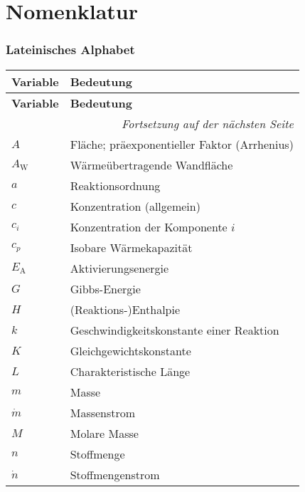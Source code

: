 \chapter*{Nomenklatur}

\setlength{\LTleft}{0pt}
\setlength{\LTright}{0pt}

\subsection*{Lateinisches Alphabet}
\begin{small}
\begin{flushleft}
\begin{longtable}{@{}ll@{}}
\toprule
\textbf{Variable} & \textbf{Bedeutung} \\
\midrule
\endfirsthead
\toprule
\textbf{Variable} & \textbf{Bedeutung} \\
\midrule
\endhead
\midrule
\multicolumn{2}{r}{\emph{Fortsetzung auf der nächsten Seite}}\\
\endfoot
\bottomrule
\endlastfoot
$A$                 & Fläche; präexponentieller Faktor (Arrhenius) \\
$A_{\mathrm{W}}$    & Wärmeübertragende Wandfläche \\
$a$                 & Reaktionsordnung \\
$c$                 & Konzentration (allgemein) \\
$c_i$               & Konzentration der Komponente $i$ \\
$c_p$               & Isobare Wärmekapazität \\
$E_{\mathrm{A}}$    & Aktivierungsenergie \\
$G$                 & Gibbs-Energie \\
$H$                 & (Reaktions-)Enthalpie \\
$k$                 & Geschwindigkeitskonstante einer Reaktion \\
$K$                 & Gleichgewichtskonstante \\
$L$                 & Charakteristische Länge \\
$m$                 & Masse \\
$\dot m$            & Massenstrom \\
$M$                 & Molare Masse \\
$n$                 & Stoffmenge \\
$\dot n$            & Stoffmengenstrom \\

\end{longtable}
\end{flushleft}
\end{small}
